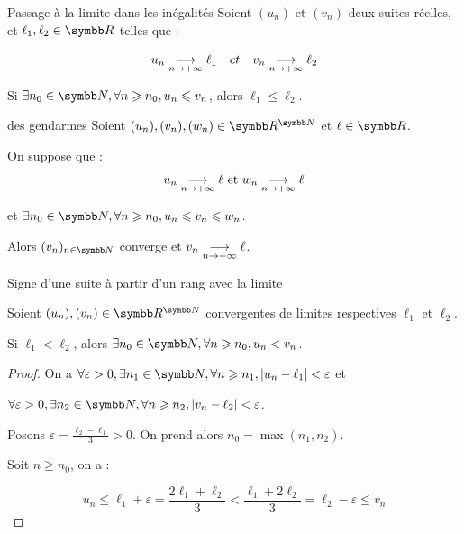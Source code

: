 \begin{theoreme}{Passage à la limite dans les inégalités}{}
    Soient $(u_n)$ et $(v_n)$ deux suites réelles, et $\ell_1, \ell_2 \in \R$ telles que :

    \[ u_n \underset{n \to +\infty}{\longrightarrow} \ell_1 \quad et \quad v_n \underset{n \to +\infty}{\longrightarrow} \ell_2 \]

    Si $\exists n_0 \in \N, \forall n \geqslant n_0, u_n \leqslant v_n$, alors $\ell_1 \leqslant \ell_2$.
\end{theoreme}

\begin{theoreme}{des gendarmes}{}
    Soient $(u_n), (v_n), (w_n) \in \R^{\N}$ et $\ell \in \R$. 
    
    On suppose que : 
    \[u_n \underset{n \to +\infty}{\longrightarrow} \ell~\text{et}~w_n \underset{n \to +\infty}{\longrightarrow} \ell\]

    et $\exists n_0 \in \N, \forall n \geqslant n_0, u_n \leqslant v_n \leqslant w_n$. 

    Alors $(v_n)_{n \in \N}$ converge et $v_n \underset{n \to +\infty}{\longrightarrow} \ell$.
    
\end{theoreme}

\begin{theoreme}{Signe d'une suite à partir d'un rang avec la limite}{}

    Soient $(u_n), (v_n) \in \R^{\N}$ convergentes de limites
    respectives $\ell_1$ et $\ell_2$.

    Si $\ell_1 < \ell_2$, alors $\exists n_0 \in \N, \forall n \geqslant n_0, u_n < v_n$.
\end{theoreme}


\begin{proof}
    On a $\forall \varepsilon > 0, \exists n_1 \in \N, \forall n \geqslant n_1, |u_n - \ell_1| < \varepsilon$ et

    $\forall \varepsilon > 0, \exists n_2 \in \N, \forall n \geqslant n_2, |v_n - \ell_2| < \varepsilon$.

    Posons $\displaystyle \varepsilon = \frac{\ell_2 - \ell_1} 3 > 0$. On prend alors 
    $n_0 = \max(n_1, n_2)$.

    Soit $n \geqslant n_0$, on a :

    \[u_n \leqslant \ell_1 + \varepsilon = \frac{2\ell_1 + \ell_2} 3 < \frac{\ell_1 + 2\ell_2}{3} = \ell_2 - \varepsilon \leqslant v_n\]
\end{proof}

